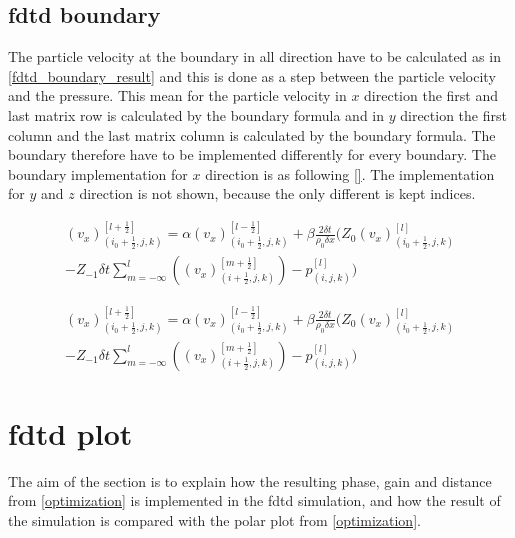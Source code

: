 \subsection{\gls{fdtd} boundary}
The particle velocity at the boundary in all direction have to be calculated as in \autoref{fdtd_boundary_result} and this is done as a step between the particle velocity and the pressure. This mean for the particle velocity in $x$ direction the first and last matrix row is calculated by the boundary formula and in $y$ direction the first column and the last matrix column is calculated by the boundary formula. The boundary therefore have to be implemented differently for every boundary. The boundary implementation for $x$ direction is as following \autoref{}. The implementation for $y$ and $z$ direction is not shown, because the only different is kept indices. 

\begin{multline}\label{fdtd_boundary_x1}
(v_x)_{(i_0+\frac{1}{2},j,k)}^{[l+\frac{1}{2}]}= \alpha (v_x)_{(i_0+\frac{1}{2},j,k)}^{[l-\frac{1}{2}]} + \beta \frac{2 \delta t}{\rho_0 \delta x} \Biggl( 
 Z_0(v_x)_{(i_0+\frac{1}{2},j,k)}^{[l]} \\
-Z_{-1} \delta t \sum_{m=-\infty}^{l} \left( (v_x)_{(i+\frac{1}{2},j,k)}^{[m+\frac{1}{2}]} \right) -p_{(i,j,k)}^{[l]}
\Biggr)
\end{multline}

\begin{multline}\label{fdtd_boundary_x2}
(v_x)_{(i_0+\frac{1}{2},j,k)}^{[l+\frac{1}{2}]}= \alpha (v_x)_{(i_0+\frac{1}{2},j,k)}^{[l-\frac{1}{2}]} + \beta \frac{2 \delta t}{\rho_0 \delta x} \Biggl( 
 Z_0(v_x)_{(i_0+\frac{1}{2},j,k)}^{[l]} \\
-Z_{-1} \delta t \sum_{m=-\infty}^{l} \left( (v_x)_{(i+\frac{1}{2},j,k)}^{[m+\frac{1}{2}]} \right) -p_{(i,j,k)}^{[l]}
\Biggr)
\end{multline}

\section{\gls{fdtd} plot}
The aim of the section is to explain how the resulting phase, gain and distance from \autoref{optimization} is implemented in the \gls{fdtd} simulation, and how the result of the simulation is compared with the polar plot from \autoref{optimization}.

